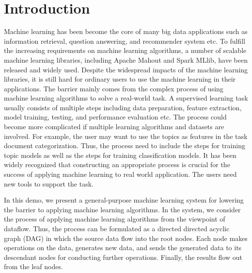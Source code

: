\documentclass{sig-alternate-05-2015}
\begin{document}

\section{Introduction}
Machine learning has been become the core of many big data applications such as information retrieval, question answering, and recommender system etc. To fulfill the increasing requirements on machine learning algorithms, a number of scalable machine learning libraries, including Apache Mahout and Spark MLlib, have been released and widely used. Despite the widespread impacts of the machine learning libraries, it is still hard for ordinary users to use the machine learning in their applications. The barrier mainly comes from the complex process of using machine learning algorithms to solve a real-world task. A supervised learning task usually consists of multiple steps including data preparation, feature extraction, model training, testing, and performance evaluation etc. The process could become more complicated if multiple learning algorithms and datasets are involved. For example, the user may want to use the topics as features in the task document categorization. Thus, the process need to include the steps for training topic models as well as the steps for training classification models. It has been widely recognized that constructing an appropriate process is crucial for the success of applying machine learning to real world application. The users need new tools to support the task.

In this demo, we present a general-purpose machine learning system for lowering the barrier to applying machine learning algorithms. In the system, we consider the process of applying machine learning algorithms from the viewpoint of dataflow. Thus, the process can be formulated as a directed directed acyclic graph (DAG) in which the source data flow into the root nodes. Each node makes operations on the data, generates new data, and sends the generated data to its descendant nodes for conducting further operations. Finally, the results flow out from the leaf nodes.
\end{document}
